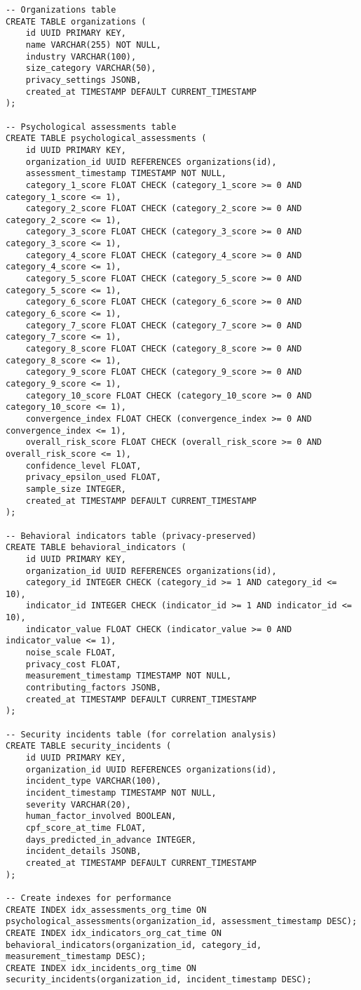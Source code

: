 \documentclass[10pt,twocolumn]{IEEEtran}
\begin{document}
\begin{lstlisting}[caption={CPF Database Schema Definition}]
-- Organizations table
CREATE TABLE organizations (
    id UUID PRIMARY KEY,
    name VARCHAR(255) NOT NULL,
    industry VARCHAR(100),
    size_category VARCHAR(50),
    privacy_settings JSONB,
    created_at TIMESTAMP DEFAULT CURRENT_TIMESTAMP
);

-- Psychological assessments table
CREATE TABLE psychological_assessments (
    id UUID PRIMARY KEY,
    organization_id UUID REFERENCES organizations(id),
    assessment_timestamp TIMESTAMP NOT NULL,
    category_1_score FLOAT CHECK (category_1_score >= 0 AND category_1_score <= 1),
    category_2_score FLOAT CHECK (category_2_score >= 0 AND category_2_score <= 1),
    category_3_score FLOAT CHECK (category_3_score >= 0 AND category_3_score <= 1),
    category_4_score FLOAT CHECK (category_4_score >= 0 AND category_4_score <= 1),
    category_5_score FLOAT CHECK (category_5_score >= 0 AND category_5_score <= 1),
    category_6_score FLOAT CHECK (category_6_score >= 0 AND category_6_score <= 1),
    category_7_score FLOAT CHECK (category_7_score >= 0 AND category_7_score <= 1),
    category_8_score FLOAT CHECK (category_8_score >= 0 AND category_8_score <= 1),
    category_9_score FLOAT CHECK (category_9_score >= 0 AND category_9_score <= 1),
    category_10_score FLOAT CHECK (category_10_score >= 0 AND category_10_score <= 1),
    convergence_index FLOAT CHECK (convergence_index >= 0 AND convergence_index <= 1),
    overall_risk_score FLOAT CHECK (overall_risk_score >= 0 AND overall_risk_score <= 1),
    confidence_level FLOAT,
    privacy_epsilon_used FLOAT,
    sample_size INTEGER,
    created_at TIMESTAMP DEFAULT CURRENT_TIMESTAMP
);

-- Behavioral indicators table (privacy-preserved)
CREATE TABLE behavioral_indicators (
    id UUID PRIMARY KEY,
    organization_id UUID REFERENCES organizations(id),
    category_id INTEGER CHECK (category_id >= 1 AND category_id <= 10),
    indicator_id INTEGER CHECK (indicator_id >= 1 AND indicator_id <= 10),
    indicator_value FLOAT CHECK (indicator_value >= 0 AND indicator_value <= 1),
    noise_scale FLOAT,
    privacy_cost FLOAT,
    measurement_timestamp TIMESTAMP NOT NULL,
    contributing_factors JSONB,
    created_at TIMESTAMP DEFAULT CURRENT_TIMESTAMP
);

-- Security incidents table (for correlation analysis)
CREATE TABLE security_incidents (
    id UUID PRIMARY KEY,
    organization_id UUID REFERENCES organizations(id),
    incident_type VARCHAR(100),
    incident_timestamp TIMESTAMP NOT NULL,
    severity VARCHAR(20),
    human_factor_involved BOOLEAN,
    cpf_score_at_time FLOAT,
    days_predicted_in_advance INTEGER,
    incident_details JSONB,
    created_at TIMESTAMP DEFAULT CURRENT_TIMESTAMP
);

-- Create indexes for performance
CREATE INDEX idx_assessments_org_time ON psychological_assessments(organization_id, assessment_timestamp DESC);
CREATE INDEX idx_indicators_org_cat_time ON behavioral_indicators(organization_id, category_id, measurement_timestamp DESC);
CREATE INDEX idx_incidents_org_time ON security_incidents(organization_id, incident_timestamp DESC);
\end{lstlisting}
\end{document}
